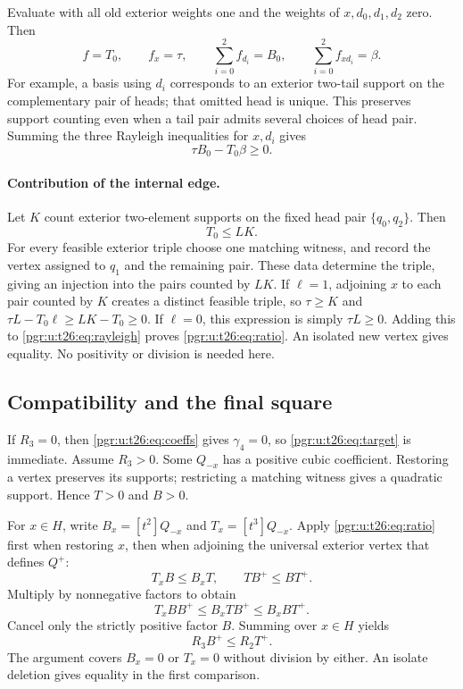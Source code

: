 \documentclass[11pt]{article}
\numberwithin{equation}{section}
\theoremstyle{definition}\newtheorem{definition}[theorem]{Definition}\newtheorem{remark}[theorem]{Remark}
\newcommand{\Qp}{Q^{+}}                    %
\newcommand{\Bp}{B^{+}}                    %
\newcommand{\Tp}{T^{+}}                    %
\begin{document}
Evaluate with all old exterior weights one and the weights of $x,d_0,d_1,d_2$ zero. Then
\[
f=T_0,\qquad f_x=\tau,\qquad
\sum_{i=0}^{2}f_{d_i}=B_0,\qquad
\sum_{i=0}^{2}f_{x d_i}=\beta.
\]
For example, a basis using $d_i$ corresponds to an exterior two-tail support on the complementary pair of heads; that omitted head is unique. This preserves support counting even when a tail pair admits several choices of head pair. Summing the three Rayleigh inequalities for $x,d_i$ gives
\begin{equation}\label{pgr:u:t26:eq:rayleigh}
\tau B_0-T_0\beta\ge0.
\end{equation}

\paragraph{Contribution of the internal edge.}
Let $K$ count exterior two-element supports on the fixed head pair $\{q_0,q_2\}$. Then
\begin{equation}\label{pgr:u:t26:eq:LK}
T_0\le LK.
\end{equation}
For every feasible exterior triple choose one matching witness, and record the vertex assigned to $q_1$ and the remaining pair. These data determine the triple, giving an injection into the pairs counted by $LK$. If $\ell=1$, adjoining $x$ to each pair counted by $K$ creates a distinct feasible triple, so $\tau\ge K$ and $\tau L-T_0\ell\ge LK-T_0\ge0$. If $\ell=0$, this expression is simply $\tau L\ge0$. Adding this to \eqref{pgr:u:t26:eq:rayleigh} proves \eqref{pgr:u:t26:eq:ratio}. An isolated new vertex gives equality. No positivity or division is needed here.

\subsection{Compatibility and the final square}
If $R_3=0$, then \eqref{pgr:u:t26:eq:coeffs} gives $\gamma_4=0$, so \eqref{pgr:u:t26:eq:target} is immediate. Assume $R_3>0$. Some $Q_{-x}$ has a positive cubic coefficient. Restoring a vertex preserves its supports; restricting a matching witness gives a quadratic support. Hence $T>0$ and $B>0$.

For $x\in H$, write $B_x=[t^2]Q_{-x}$ and $T_x=[t^3]Q_{-x}$. Apply \eqref{pgr:u:t26:eq:ratio} first when restoring $x$, then when adjoining the universal exterior vertex that defines $\Qp$:
\[
T_xB\le B_xT,\qquad T\Bp\le B\Tp.
\]
Multiply by nonnegative factors to obtain
\[
T_xB\Bp\le B_xT\Bp\le B_xB\Tp.
\]
Cancel only the strictly positive factor $B$. Summing over $x\in H$ yields
\begin{equation}\label{pgr:u:t26:eq:compatibility}
R_3\Bp\le R_2\Tp.
\end{equation}
The argument covers $B_x=0$ or $T_x=0$ without division by either. An isolate deletion gives equality in the first comparison.
\end{document}

